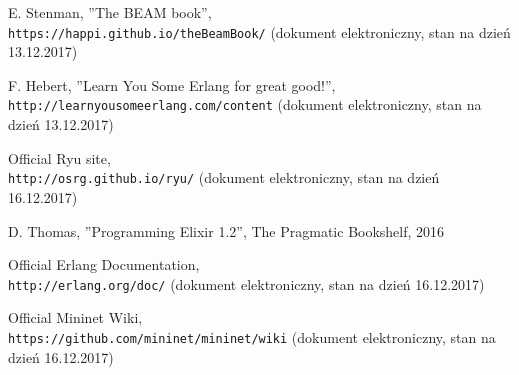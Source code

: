 \begin{thebibliography}{99}
E. Stenman,
''The BEAM book'',
\\\texttt{https://happi.github.io/theBeamBook/} (dokument elektroniczny, stan na
dzień 13.12.2017)

F. Hebert,
''Learn You Some Erlang for great good!'',
\\\texttt{http://learnyousomeerlang.com/content} (dokument elektroniczny, stan
na dzień 13.12.2017)

Official Ryu site,
\\\texttt{http://osrg.github.io/ryu/} (dokument elektroniczny, stan
na dzień 16.12.2017)

D. Thomas,
''Programming Elixir 1.2'',
The Pragmatic Bookshelf, 2016 

Official Erlang Documentation,
\\\texttt{http://erlang.org/doc/} (dokument elektroniczny, stan
na dzień 16.12.2017)

Official Mininet Wiki,
\\\texttt{https://github.com/mininet/mininet/wiki} (dokument elektroniczny, stan
na dzień 16.12.2017)
\end{thebibliography}